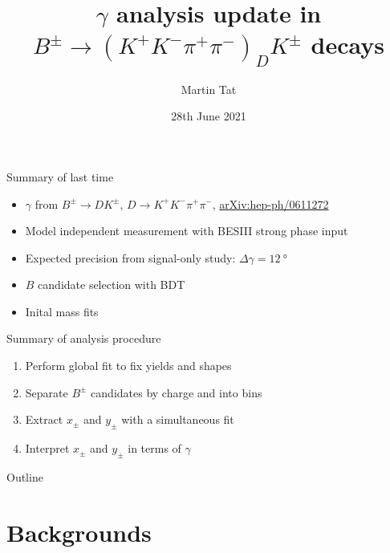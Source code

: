 \documentclass{beamer}
\title[$B^\pm\to(K^+K^-\pi^+\pi^-)_DK^\pm$]{\texorpdfstring{$\gamma$}{gamma} analysis update in \texorpdfstring{$B^\pm\to(K^+K^-\pi^+\pi^-)_DK^\pm$}{B to K+K-pi+pi-} decays}
\author{Martin Tat}
\institute{Oxford LHCb}
\date{28th June 2021}
\begin{document}
\begin{frame}
  \titlepage
\end{frame}

\begin{frame}{Summary of last time}
  \begin{itemize}
    \setlength\itemsep{1.5em}
    \item{$\gamma$ from $B^\pm\to DK^\pm$, $D\to K^+K^-\pi^+\pi^-$, \href{https://arxiv.org/abs/hep-ph/0611272}{arXiv:hep-ph/0611272}}
    \item{Model independent measurement with BESIII strong phase input}
    \item{Expected precision from signal-only study: $\Delta\gamma = \SI{12}{\degree}$}
    \item{$B$ candidate selection with BDT}
    \item{Inital mass fits}
  \end{itemize}
\end{frame}

\begin{frame}{Summary of analysis procedure}
  \begin{enumerate}
    \setlength\itemsep{1.5em}
      \item{Perform global fit to fix yields and shapes}
      \item{Separate $B^\pm$ candidates by charge and into bins}
      \item{Extract $x_\pm$ and $y_\pm$ with a simultaneous fit}
      \item{Interpret $x_\pm$ and $y_\pm$ in terms of $\gamma$}
  \end{enumerate}
\end{frame}

\begin{frame}{Outline}
  \tableofcontents
\end{frame}

\section{Backgrounds}
\end{document}
